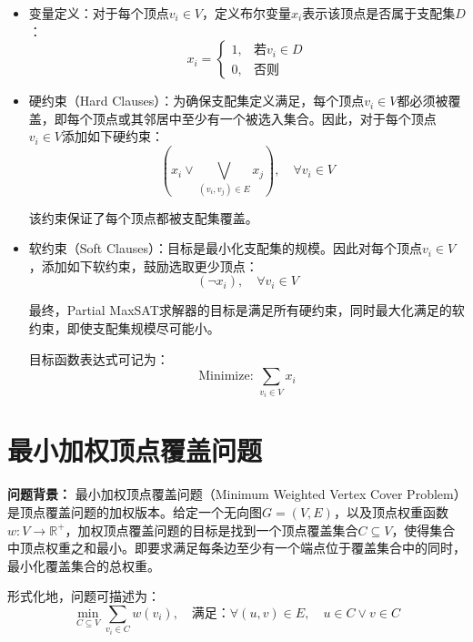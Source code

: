 \documentclass{article}
\begin{document}
\begin{itemize}
    \item 变量定义：对于每个顶点$v_i\in V$，定义布尔变量$x_i$表示该顶点是否属于支配集$D$：
    \[
    x_i =
    \begin{cases}
        1, & \text{若$v_i\in D$}\\[4pt]
        0, & \text{否则}
    \end{cases}
    \]

    \item 硬约束（Hard Clauses）：为确保支配集定义满足，每个顶点$v_i\in V$都必须被覆盖，即每个顶点或其邻居中至少有一个被选入集合。因此，对于每个顶点$v_i\in V$添加如下硬约束：
    \[
    \left(x_i \vee \bigvee_{(v_i,v_j)\in E} x_j\right),\quad\forall v_i\in V
    \]

    该约束保证了每个顶点都被支配集覆盖。

    \item 软约束（Soft Clauses）：目标是最小化支配集的规模。因此对每个顶点$v_i\in V$，添加如下软约束，鼓励选取更少顶点：
    \[
    (\neg x_i),\quad\forall v_i\in V
    \]

    最终，Partial MaxSAT求解器的目标是满足所有硬约束，同时最大化满足的软约束，即使支配集规模尽可能小。

    目标函数表达式可记为：
    \[
    \text{Minimize: } \sum_{v_i\in V} x_i
    \]

\end{itemize}

\newpage
\section*{最小加权顶点覆盖问题}
\textbf{问题背景：}
最小加权顶点覆盖问题（Minimum Weighted Vertex Cover Problem）是顶点覆盖问题的加权版本。给定一个无向图$G=(V,E)$，以及顶点权重函数$w: V \rightarrow \mathbb{R}^{+}$，加权顶点覆盖问题的目标是找到一个顶点覆盖集合$C \subseteq V$，使得集合中顶点权重之和最小。即要求满足每条边至少有一个端点位于覆盖集合中的同时，最小化覆盖集合的总权重。

形式化地，问题可描述为：
\[
\min_{C \subseteq V} \sum_{v_i \in C} w(v_i),\quad\text{满足：}\forall (u,v)\in E,\quad u\in C\vee v\in C
\]
\end{document}
